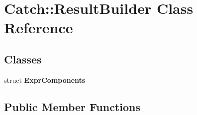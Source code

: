 \hypertarget{classCatch_1_1ResultBuilder}{
\section{Catch::ResultBuilder Class Reference}
\label{classCatch_1_1ResultBuilder}
}
\subsection*{Classes}
\begin{DoxyCompactItemize}
\item 
struct {\bfseries ExprComponents}
\end{DoxyCompactItemize}
\subsection*{Public Member Functions}
